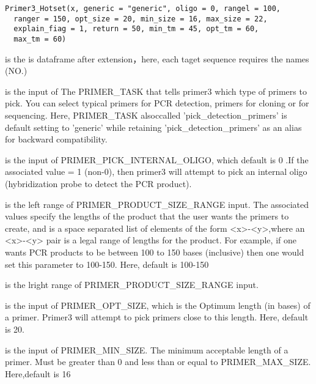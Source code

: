 \documentclass[a4paper]{book}
\begin{document}
%
\begin{Usage}
\begin{verbatim}
Primer3_Hotset(x, generic = "generic", oligo = 0, rangel = 100,
  ranger = 150, opt_size = 20, min_size = 16, max_size = 22,
  explain_fiag = 1, return = 50, min_tm = 45, opt_tm = 60,
  max_tm = 60)
\end{verbatim}
\end{Usage}
%
\begin{Arguments}
\begin{ldescription}
\item[\code{x}] is the is dataframe after extension，here, each taget sequence requires the names (NO.)

\item[\code{generic}] is the input of The PRIMER\_TASK that tells primer3 which type of primers to pick.
You can select typical primers for PCR detection, primers for cloning or for sequencing. Here,
PRIMER\_TASK alsoccalled 'pick\_detection\_primers' is default setting  to 'generic' while
retaining 'pick\_detection\_primers' as an alias for backward compatibility.

\item[\code{oligo}] is the input of PRIMER\_PICK\_INTERNAL\_OLIGO, which default is 0 .If the associated
value = 1 (non-0), then primer3 will attempt to pick an internal oligo (hybridization probe to
detect the PCR product).

\item[\code{rangel}] is the left range  of PRIMER\_PRODUCT\_SIZE\_RANGE input. The associated values specify the lengths
of the product that the user wants the primers to create, and is a space separated list of elements
of the form <x>-<y>,where an <x>-<y> pair is a legal range of lengths for the product. For example,
if one wants PCR products to be between 100 to 150 bases (inclusive) then one would set this parameter
to 100-150. Here, default is 100-150

\item[\code{ranger}] is the lright  range  of PRIMER\_PRODUCT\_SIZE\_RANGE input.

\item[\code{opt\_size}] is the input of PRIMER\_OPT\_SIZE, which is the Optimum length (in bases) of a primer.
Primer3 will attempt to pick primers close to this length. Here, default is 20.

\item[\code{min\_size}] is the input of PRIMER\_MIN\_SIZE. The minimum acceptable length of a primer.
Must be greater than 0 and less than or equal to PRIMER\_MAX\_SIZE. Here,default is 16


\end{ldescription}
\end{Arguments}
\end{document}
